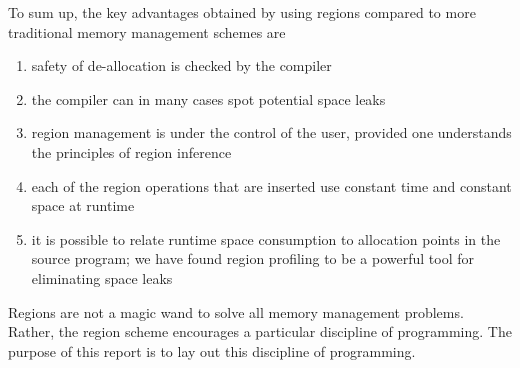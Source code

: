 \documentclass[12pt]{book}
\begin{document}
To sum up, the key advantages obtained by using regions compared to more 
traditional memory management schemes are
\begin{enumerate}
\item safety of de-allocation is checked by the compiler
\item the compiler can in many cases spot potential space leaks
\item region management is under the control of the user, provided one
  understands the principles of region inference
\item each of the region operations that are inserted use constant
  time and constant space at runtime
\item it is possible to relate runtime space consumption to allocation
  points in the source program; we have found region profiling to be a
  powerful tool for eliminating space leaks
\end{enumerate}
Regions are not a magic wand to solve all memory management problems.
Rather, the region scheme encourages a particular discipline of
programming. The purpose of this report is to lay out this discipline
of programming.
\end{document}
